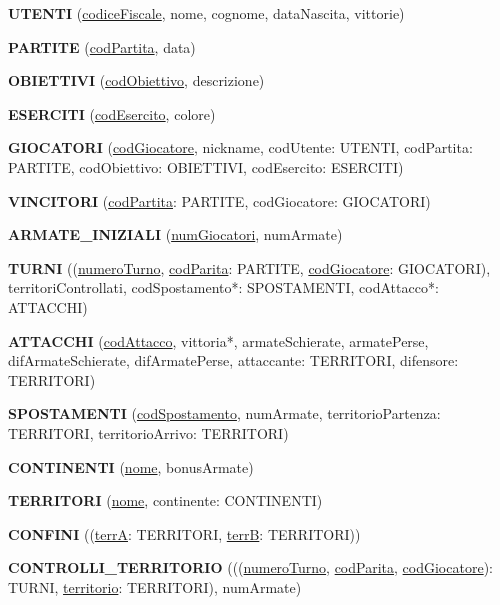 \documentclass[a4paper,12pt]{report}
\begin{document}
\begin{description}
    \item \textbf{UTENTI} (\underline{codiceFiscale}, nome, cognome, dataNascita, vittorie) \par
    \item \textbf{PARTITE} (\underline{codPartita}, data) \par
    \item \textbf{OBIETTIVI} (\underline{codObiettivo}, descrizione) \par
    \item \textbf{ESERCITI} (\underline{codEsercito}, colore) \par
    \item \textbf{GIOCATORI} (\underline{codGiocatore}, nickname, codUtente: UTENTI, codPartita: PARTITE, codObiettivo: OBIETTIVI, codEsercito: ESERCITI) \par
    \item \textbf{VINCITORI} (\underline{codPartita}: PARTITE, codGiocatore: GIOCATORI) \par
    \item \textbf{ARMATE\_INIZIALI} (\underline{numGiocatori}, numArmate) \par
    \item \textbf{TURNI} ((\underline{numeroTurno}, \underline{codParita}: PARTITE, \underline{codGiocatore}: GIOCATORI), territoriControllati, codSpostamento*: SPOSTAMENTI, codAttacco*: ATTACCHI) \par
    \item \textbf{ATTACCHI} (\underline{codAttacco}, vittoria*, armateSchierate, armatePerse, difArmateSchierate, difArmatePerse, attaccante: TERRITORI, difensore: TERRITORI) \par
    \item \textbf{SPOSTAMENTI} (\underline{codSpostamento}, numArmate, territorioPartenza: TERRITORI, territorioArrivo: TERRITORI) \par
    \item \textbf{CONTINENTI} (\underline{nome}, bonusArmate) \par
    \item \textbf{TERRITORI} (\underline{nome}, continente: CONTINENTI) \par
    \item \textbf{CONFINI} ((\underline{terrA}: TERRITORI, \underline{terrB}: TERRITORI)) \par
    \item \textbf{CONTROLLI\_TERRITORIO} (((\underline{numeroTurno}, \underline{codParita}, \underline{codGiocatore}): TURNI, \underline{territorio}: TERRITORI), numArmate) \par
\end{description}
\end{document}
